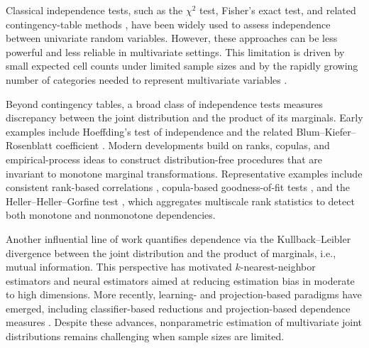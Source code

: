 \documentclass[12pt,reqno,oneside]{amsbook}
\theoremstyle{definition}
\theoremstyle{remark}
\begin{document}
Classical independence tests, such as the $\chi^2$ test, Fisher’s exact test, and related contingency-table methods \cite{Agresti2013}, have been widely used to assess independence between univariate random variables. However, these approaches can be less powerful and less reliable in multivariate settings. This limitation is driven by small expected cell counts under limited sample sizes and by the rapidly growing number of categories needed to represent multivariate variables \cite{Szekely2007,Gretton2005HSIC}. 

Beyond contingency tables, a broad class of independence tests measures discrepancy between the joint distribution and the product of its marginals. Early examples include Hoeffding’s test of independence \cite{Hoeffding1948} and the related Blum--Kiefer--Rosenblatt coefficient \cite{Blum1961}. Modern developments build on ranks, copulas, and empirical-process ideas to construct distribution-free procedures that are invariant to monotone marginal transformations. Representative examples include consistent rank-based correlations \cite{Bergsma2014,Chatterjee2021}, copula-based goodness-of-fit tests \cite{Genest2004,Kojadinovic2005,Remillard2009}, and the Heller--Heller--Gorfine test \cite{Heller2013}, which aggregates multiscale rank statistics to detect both monotone and nonmonotone dependencies.

Another influential line of work quantifies dependence via the Kullback--Leibler divergence between the joint distribution and the product of marginals, i.e., mutual information. This perspective has motivated $k$-nearest-neighbor estimators \cite{Kraskov2004,Gao2017,Singh2003} and neural estimators \cite{Belghazi2018MINE, Poole2019}
aimed at reducing estimation bias in moderate to high dimensions. More recently, learning- and projection-based paradigms have emerged, including classifier-based reductions \cite{LopezPaz2017,Muandet2017,Kim2019} and projection-based dependence measures \cite{Zhu2017,Weihs2018}. Despite these advances, nonparametric estimation of multivariate joint distributions remains challenging when sample sizes are limited.
\end{document}
